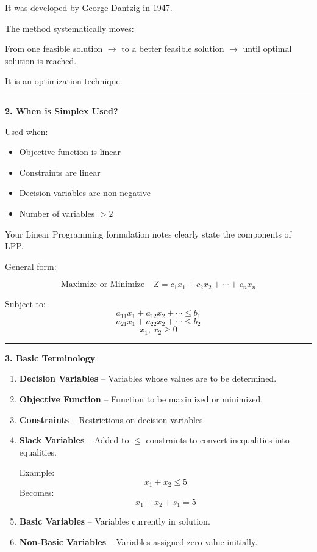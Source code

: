 \documentclass[10pt,a4paper]{article}
\newcommand{\separator}{\vspace{0.4em}\noindent\rule{\linewidth}{0.6pt}\vspace{0.4em}}
\begin{document}
It was developed by George Dantzig in 1947.

The method systematically moves:

From one feasible solution $\rightarrow$ to a better feasible solution $\rightarrow$ until optimal solution is reached.

It is an optimization technique.

\separator

\textbf{2. When is Simplex Used?}

Used when:
\begin{itemize}
  \item Objective function is linear
  \item Constraints are linear
  \item Decision variables are non-negative
  \item Number of variables $> 2$
\end{itemize}

Your Linear Programming formulation notes clearly state the components of LPP.

General form:

\[
\text{Maximize or Minimize} \quad Z = c_1 x_1 + c_2 x_2 + \cdots + c_n x_n
\]

Subject to:
\[
a_{11} x_1 + a_{12} x_2 + \cdots \leq b_1
\]
\[
a_{21} x_1 + a_{22} x_2 + \cdots \leq b_2
\]
\[
x_1,\, x_2 \geq 0
\]

\separator

\textbf{3. Basic Terminology}

\begin{enumerate}
  \item \textbf{Decision Variables} -- Variables whose values are to be determined.
  \item \textbf{Objective Function} -- Function to be maximized or minimized.
  \item \textbf{Constraints} -- Restrictions on decision variables.
  \item \textbf{Slack Variables} -- Added to $\leq$ constraints to convert inequalities into equalities.

    Example:
    \[
    x_1 + x_2 \leq 5
    \]
    Becomes:
    \[
    x_1 + x_2 + s_1 = 5
    \]

  \item \textbf{Basic Variables} -- Variables currently in solution.
  \item \textbf{Non-Basic Variables} -- Variables assigned zero value initially.
\end{enumerate}
\end{document}
